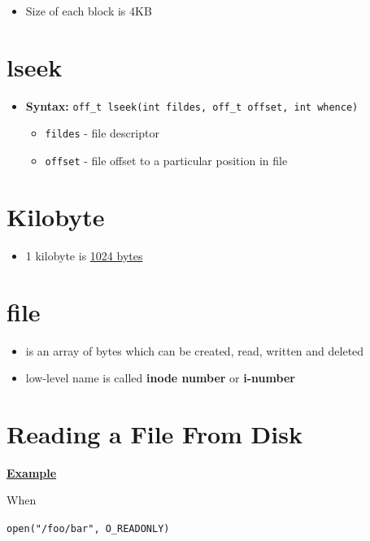 \documentclass[12pt]{article}
\begin{document}
\begin{itemize}
    \item Size of each block is 4KB
\end{itemize}

\section*{lseek}

\begin{itemize}
    \item \textbf{Syntax:} \texttt{off\_t lseek(int fildes, off\_t offset, int whence)}

    \begin{itemize}
        \item \texttt{fildes} - file descriptor
        \item \texttt{offset} - file offset to a particular position in file
    \end{itemize}
\end{itemize}

\section*{Kilobyte}

\begin{itemize}
    \item 1 kilobyte is \underline{1024 bytes}
\end{itemize}

\section*{file}
\begin{itemize}
    \item is an array of bytes which can be created, read, written and deleted
    \item low-level name is called \textbf{inode number} or \textbf{i-number}
\end{itemize}
\section*{Reading a File From Disk}

\bigskip

\underline{\textbf{Example}}

\bigskip

When

\bigskip

\texttt{open("/foo/bar", O\_READONLY)}
\end{document}
